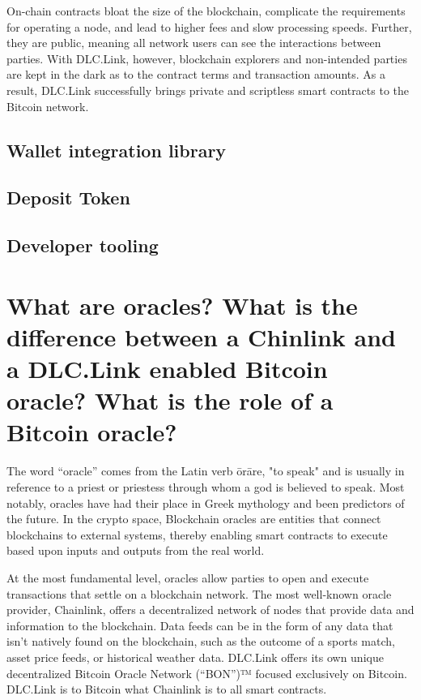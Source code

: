 \documentclass[twoside, a4paper, 11pt]{article}
\begin{document}
  On-chain contracts bloat the size of the blockchain, complicate the requirements for operating a node, and lead to higher fees and slow processing speeds. Further, they are public, meaning all network users can see the interactions between parties. With DLC.Link, however, blockchain explorers and non-intended parties are kept in the dark as to the contract terms and transaction amounts. As a result, DLC.Link successfully brings private and scriptless smart contracts to the Bitcoin network.

  \subsection{Wallet integration library}


  \subsection{Deposit Token}


  \subsection{Developer tooling}

  \section{What are oracles? What is the difference between a Chinlink and a DLC.Link enabled Bitcoin oracle? What is the role of a Bitcoin oracle?}

  The word “oracle” comes from the Latin verb ōrāre, "to speak" and is usually in reference to a priest or priestess through whom a god is believed to speak. Most notably, oracles have had their place in Greek mythology and been predictors of the future. In the crypto space, Blockchain oracles are entities that connect blockchains to external systems, thereby enabling smart contracts to execute based upon inputs and outputs from the real world.

  At the most fundamental level, oracles allow parties to open and execute transactions that settle on a blockchain network. The most well-known oracle provider, Chainlink, offers a decentralized network of nodes that provide data and information to the blockchain. Data feeds can be in the form of any data that isn’t natively found on the blockchain, such as the outcome of a sports match, asset price feeds, or historical weather data. DLC.Link offers its own unique decentralized Bitcoin Oracle Network (“BON”)™ focused exclusively on Bitcoin. DLC.Link is to Bitcoin what Chainlink is to all smart contracts.
\end{document}
